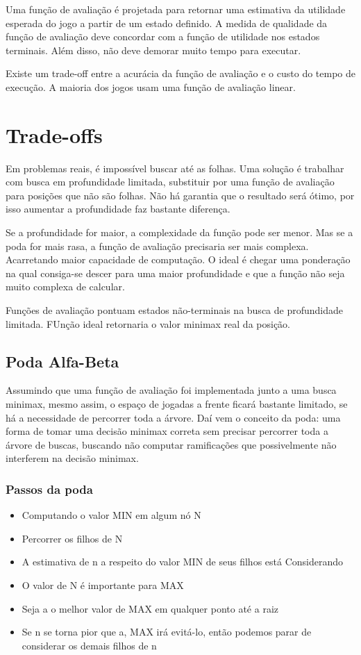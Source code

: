 \documentclass[sigplan,screen]{acmart}
\begin{document}
Uma função de avaliação é projetada para retornar uma estimativa da utilidade esperada do jogo a partir de um estado definido. 
A medida de qualidade da função de avaliação deve concordar com a função de utilidade nos estados terminais. Além disso, não deve demorar muito tempo para executar.

Existe um trade-off entre a acurácia da função de avaliação e o custo do tempo de execução. 
A maioria dos jogos usam uma função de avaliação linear.


\section{Trade-offs}

Em problemas reais, é impossível buscar até as folhas. 
Uma solução é trabalhar com busca em profundidade limitada, substituir por uma função de avaliação para posições que não são folhas.
Não há garantia que o resultado será ótimo, por isso aumentar a profundidade faz bastante diferença.

Se a profundidade for maior, a complexidade da função pode ser menor. Mas se a poda for mais rasa, a função de avaliação precisaria ser mais complexa. 
Acarretando maior capacidade de computação. 
O ideal é chegar uma ponderação na qual consiga-se descer para uma maior profundidade e que a função não seja muito complexa de calcular.

Funções de avaliação pontuam estados não-terminais na busca de profundidade limitada.
FUnção ideal retornaria o valor minimax real da posição.

\subsection{Poda Alfa-Beta}
Assumindo que uma função de avaliação foi implementada junto a uma busca minimax, mesmo assim, o espaço de jogadas a frente ficará bastante limitado, se há a necessidade de percorrer toda a árvore.
Daí vem o conceito da poda: uma forma de tomar uma decisão minimax correta sem precisar percorrer toda a árvore de buscas, buscando não computar ramificações que possivelmente não interferem na decisão minimax.

\subsubsection{Passos da poda}
\begin{itemize}
  \item Computando o valor MIN em algum nó N
  \item Percorrer os filhos de N
  \item A estimativa de n a respeito do valor MIN de seus filhos está Considerando
  \item O valor de N é importante para MAX
  \item Seja a o melhor valor de MAX em qualquer ponto até a raiz
  \item Se n se torna pior que a, MAX irá evitá-lo, então podemos parar de considerar os demais filhos de n
\end{itemize}
\end{document}
